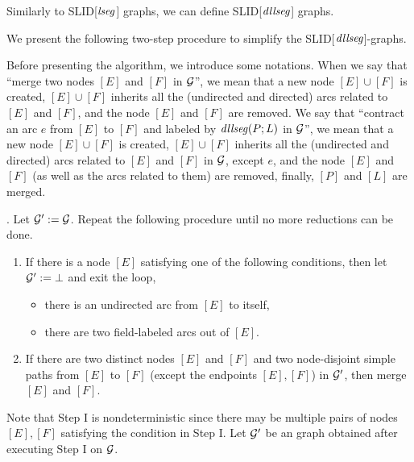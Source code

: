 \documentclass{llncs}
\begin{document}
Similarly to SLID[$\mathit{lseg}$] graphs, we can define SLID[$\mathit{dllseg}$] graphs.

We present the following two-step procedure to simplify the SLID[$\mathit{dllseg}$]-graphs.

Before presenting the algorithm, we introduce some notations. When we say that ``merge two nodes $[E]$ and $[F]$ in $\mathcal{G}$'', we mean that a new node $[E] \cup [F]$ is created, $[E] \cup [F]$ inherits all the (undirected and directed) arcs related to $[E]$ and $[F]$, and the node $[E]$ and $[F]$ are removed. We say that ``contract an arc $e$ from $[E]$ to $[F]$ and labeled by $\mathit{dllseg}(P;L)$ in $\mathcal{G}$'', we mean that a new node $[E] \cup [F]$ is created, $[E] \cup [F]$ inherits all the (undirected and directed) arcs related to $[E]$ and $[F]$ in $\mathcal{G}$, except $e$, and the node $[E]$ and $[F]$ (as well as the arcs related to them) are removed, finally, $[P]$ and $[L]$ are merged.  


\smallskip
{}. Let $\mathcal{G}':=\mathcal{G}$. Repeat the following procedure until no more reductions can be done.
\begin{enumerate}
\item If there is a node $[E]$ satisfying one of the following conditions, then let $\mathcal{G}':=\bot$ and exit the loop,
\begin{itemize}
\item there is an undirected arc from $[E]$ to itself,
%
\item there are two field-labeled arcs out of $[E]$.
\end{itemize}
%
\item If there are two distinct nodes $[E]$ and $[F]$ and two node-disjoint simple paths from $[E]$ to $[F]$ (except the endpoints $[E],[F]$) in $\mathcal{G}'$, then merge $[E]$ and $[F]$.
\end{enumerate}
Note that Step I is nondeterministic since there may be multiple pairs of nodes $[E],[F]$ satisfying the condition in Step I.
Let $\mathcal{G}'$ be an graph obtained after executing Step I on $\mathcal{G}$.
\end{document}
